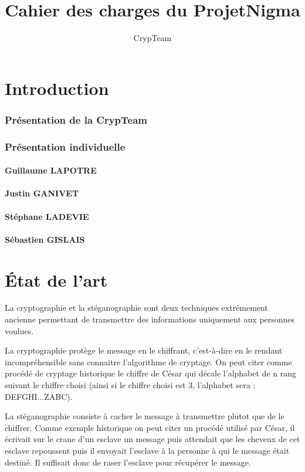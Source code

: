 \documentclass[a4paper,12pt]{article}
\title{Cahier des charges du ProjetNigma}
\author{CrypTeam}
\date{}
\begin{document}
	\maketitle{}
  	\tableofcontents
	\newpage
	\part{Introduction}
        \section {Présentation de la CrypTeam}
        \section {Présentation individuelle}
        \subsection{Guillaume LAPOTRE}
        \subsection{Justin GANIVET}
        \subsection{Stéphane LADEVIE}
        \subsection{Sébastien GISLAIS}
	\newpage
	\part{\'{E}tat de l'art}
		La cryptographie et la stéganographie sont deux techniques extrêmement ancienne permettant de transmettre des informations uniquement aux personnes voulues.

 La cryptographie protège le message en le chiffrant, c'est-à-dire en le rendant incompréhensible sans connaitre l'algorithme de cryptage. On peut citer comme procédé de cryptage historique le chiffre de César qui décale l'alphabet de n rang suivant le chiffre choisi (ainsi si le chiffre choisi est 3, l'alphabet sera : DEFGHI...ZABC).

	La stéganographie consiste à cacher le message à transmettre plutot que de le chiffrer. Comme exemple historique on peut citer un procédé utilisé par César, il écrivait sur le crane d'un esclave un message puis attendait que les cheveux de cet esclave repoussent puis il envoyait l'esclave à la personne à qui le message était destiné. Il suffisait donc de raser l'esclave pour récupérer le message.
\end{document}
